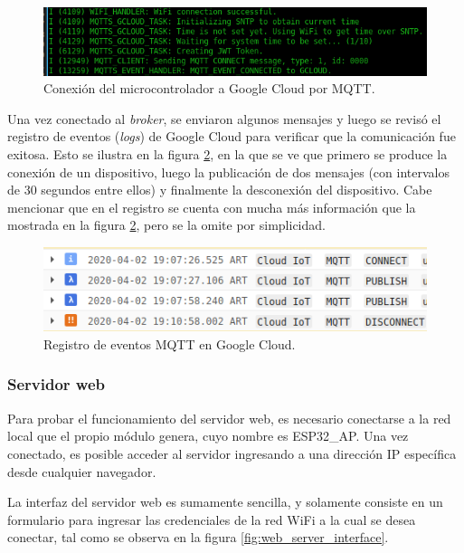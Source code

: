 \begin{figure}[h]
\centering
\includegraphics[width=\textwidth]{./Figures/output_gcloud_connection.png}
\caption{Conexión del microcontrolador a Google Cloud por MQTT.}
\label{fig:output_gcloud_connection}
\end{figure}

Una vez conectado al \emph{broker}, se enviaron algunos mensajes y luego se revisó el registro de eventos (\emph{logs}) de Google Cloud para verificar que la comunicación fue exitosa. Esto se ilustra en la figura \ref{fig:gcloud_log}, en la que se ve que primero se produce la conexión de un dispositivo, luego la publicación de dos mensajes (con intervalos de 30 segundos entre ellos) y finalmente la desconexión del dispositivo. Cabe mencionar que en el registro se cuenta con mucha más información que la mostrada en la figura \ref{fig:gcloud_log}, pero se la omite por simplicidad.

\begin{figure}[h]
\centering
\includegraphics[width=\textwidth]{./Figures/gcloud_log.png}
\caption{Registro de eventos MQTT en Google Cloud.}
\label{fig:gcloud_log}
\end{figure}

\subsubsection{Servidor web}

Para probar el funcionamiento del servidor web, es necesario conectarse a la red local que el propio módulo genera, cuyo nombre es ESP32\_AP. Una vez conectado, es posible acceder al servidor ingresando a una dirección IP específica desde cualquier navegador.

La interfaz del servidor web es sumamente sencilla, y solamente consiste en un formulario para ingresar las credenciales de la red WiFi a la cual se desea conectar, tal como se observa en la figura \ref{fig:web_server_interface}.

